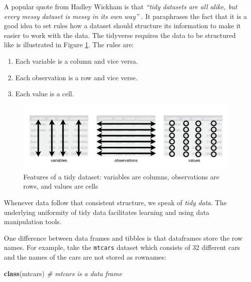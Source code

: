 \documentclass[
  12pt,
  oneside]{book}
\newenvironment{Shaded}{\begin{snugshade}}{\end{snugshade}}
\newcommand{\CommentTok}[1]{\textcolor[rgb]{0.56,0.35,0.01}{\textit{#1}}}
\newcommand{\FunctionTok}[1]{\textcolor[rgb]{0.13,0.29,0.53}{\textbf{#1}}}
\newcommand{\NormalTok}[1]{#1}
\providecommand{\tightlist}{%
  \setlength{\itemsep}{0pt}\setlength{\parskip}{0pt}}
\begin{document}
A popular quote from Hadley Wickham is that \emph{``tidy datasets are all alike, but every messy dataset is messy in its own way''} \citep[p.~2]{Hadley2014Tidy}. It paraphrases the fact that it is a good idea to set rules how a dataset should structure its information to make it easier to work with the data. The tidyverse requires the data to be structured like is illustrated in Figure \ref{fig:tidy-1}. The rules are:

\begin{enumerate}
\def\labelenumi{\arabic{enumi}.}
\tightlist
\item
  Each variable is a column and vice versa.
\item
  Each observation is a row and vice verse.
\item
  Each value is a cell.
\end{enumerate}

\begin{figure}
\centering
\includegraphics[width=1\textwidth,height=\textheight]{fig/tidy-1.png}
\caption[\label{fig:tidy-1} Features of a tidy dataset: variables are columns, observations are rows, and values are cells]{\label{fig:tidy-1} Features of a tidy dataset: variables are columns, observations are rows, and values are cells\footnotemark{}}
\end{figure}

Whenever data follow that consistent structure, we speak of \emph{tidy data}. The underlying uniformity of tidy data facilitates learning and using data manipulation tools.

One difference between data frames and tibbles is that dataframes store the row names. For example, take the \texttt{mtcars} dataset which consists of 32 different cars and the names of the cars are not stored as rownames:

\begin{Shaded}
\begin{Highlighting}[]
\FunctionTok{class}\NormalTok{(mtcars) }\CommentTok{\# mtcars is a data frame}
\end{Highlighting}
\end{Shaded}
\end{document}
